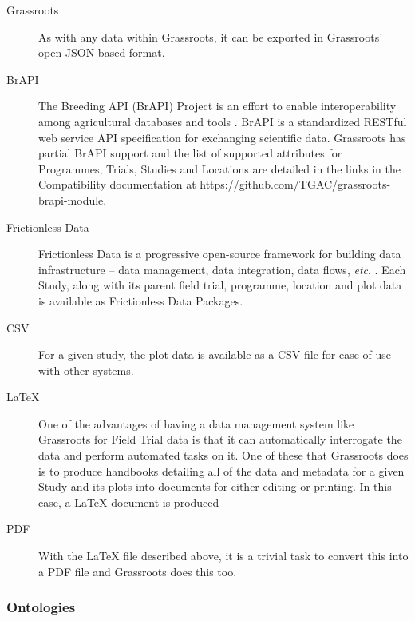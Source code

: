 \documentclass[12pt,a4paper]{extarticle}
\begin{document}
\begin{description}

\item[Grassroots] As with any data within Grassroots, it can be exported in Grassroots' open JSON-based format.

\item[BrAPI] The Breeding API (BrAPI) Project is an effort to enable interoperability among agricultural databases and tools \cite{brapi}. 
BrAPI is a standardized RESTful web service API specification for exchanging scientific data. 
Grassroots has partial BrAPI support \cite{grassroots_brapi} and the list of supported attributes for Programmes, Trials, Studies and Locations are detailed in the links in the Compatibility documentation at https://github.com/TGAC/grassroots-brapi-module.

\item[Frictionless Data] Frictionless Data is a progressive open-source framework for building data infrastructure – data management, data integration, data flows, \textit{etc}. \cite{frictionless}. Each Study, along with its parent field trial, programme, location and plot data is available as Frictionless Data Packages.


\item[CSV] For a given study, the plot data is available as a CSV file for ease of use with other systems.

\item[LaTeX] One of the advantages of having a data management system like Grassroots for Field Trial data is that it can automatically interrogate the data and perform automated tasks on it. 
One of these that Grassroots does is to produce handbooks detailing all of the data and metadata for a given Study and its plots into documents for either editing or printing. 
In this case, a LaTeX document is produced

\item[PDF] With the LaTeX file described above, it is a trivial task to convert this into a PDF file and Grassroots does this too. 


\end{description}


\subsubsection*{Ontologies}




\end{document}
